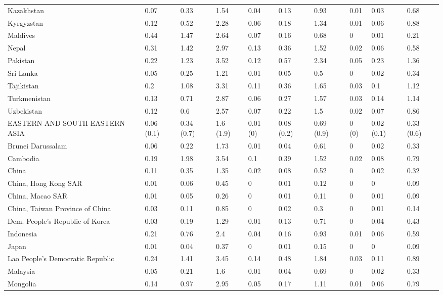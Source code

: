 \begin{longtable}[t]{llllllllll}
Kazakhstan & 0.07 & 0.33 & 1.54 & 0.04 & 0.13 & 0.93 & 0.01 & 0.03 & 0.68\\
Kyrgyzstan & 0.12 & 0.52 & 2.28 & 0.06 & 0.18 & 1.34 & 0.01 & 0.06 & 0.88\\
Maldives & 0.44 & 1.47 & 2.64 & 0.07 & 0.16 & 0.68 & 0 & 0.01 & 0.21\\
Nepal & 0.31 & 1.42 & 2.97 & 0.13 & 0.36 & 1.52 & 0.02 & 0.06 & 0.58\\
Pakistan & 0.22 & 1.23 & 3.52 & 0.12 & 0.57 & 2.34 & 0.05 & 0.23 & 1.36\\
Sri Lanka & 0.05 & 0.25 & 1.21 & 0.01 & 0.05 & 0.5 & 0 & 0.02 & 0.34\\
Tajikistan & 0.2 & 1.08 & 3.31 & 0.11 & 0.36 & 1.65 & 0.03 & 0.1 & 1.12\\
Turkmenistan & 0.13 & 0.71 & 2.87 & 0.06 & 0.27 & 1.57 & 0.03 & 0.14 & 1.14\\
Uzbekistan & 0.12 & 0.6 & 2.57 & 0.07 & 0.22 & 1.5 & 0.02 & 0.07 & 0.86\\
EASTERN AND SOUTH-EASTERN ASIA & 0.06 (0.1) & 0.34 (0.7) & 1.6 (1.9) & 0.01 (0) & 0.08 (0.2) & 0.69 (0.9) & 0 (0) & 0.02 (0.1) & 0.33 (0.6)\\
Brunei Darussalam & 0.06 & 0.22 & 1.73 & 0.01 & 0.04 & 0.61 & 0 & 0.02 & 0.33\\
Cambodia & 0.19 & 1.98 & 3.54 & 0.1 & 0.39 & 1.52 & 0.02 & 0.08 & 0.79\\
China & 0.11 & 0.35 & 1.35 & 0.02 & 0.08 & 0.52 & 0 & 0.02 & 0.32\\
China, Hong Kong SAR & 0.01 & 0.06 & 0.45 & 0 & 0.01 & 0.12 & 0 & 0 & 0.09\\
China, Macao SAR & 0.01 & 0.05 & 0.26 & 0 & 0.01 & 0.11 & 0 & 0.01 & 0.09\\
China, Taiwan Province of China & 0.03 & 0.11 & 0.85 & 0 & 0.02 & 0.3 & 0 & 0.01 & 0.14\\
Dem. People's Republic of Korea & 0.03 & 0.19 & 1.29 & 0.01 & 0.13 & 0.71 & 0 & 0.04 & 0.43\\
Indonesia & 0.21 & 0.76 & 2.4 & 0.04 & 0.16 & 0.93 & 0.01 & 0.06 & 0.59\\
Japan & 0.01 & 0.04 & 0.37 & 0 & 0.01 & 0.15 & 0 & 0 & 0.09\\
Lao People's Democratic Republic & 0.24 & 1.41 & 3.45 & 0.14 & 0.48 & 1.84 & 0.03 & 0.11 & 0.89\\
Malaysia & 0.05 & 0.21 & 1.6 & 0.01 & 0.04 & 0.69 & 0 & 0.02 & 0.33\\
Mongolia & 0.14 & 0.97 & 2.95 & 0.05 & 0.17 & 1.11 & 0.01 & 0.06 & 0.79\\

\end{longtable}
